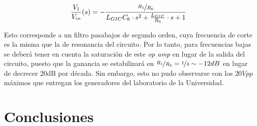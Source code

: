 \documentclass[../../tc_tp3_main.tex]{subfiles}
\begin{document}
\begin{equation}
	\frac{V_1}{V_{in}} (s)=  - \frac{\nicefrac{R_1}{R_6}}{ L_{GIC}C_6 \cdot s^2  + \frac{L_{GIC}}{R_6} \cdot s + 1}
\end{equation}

Esto corresponde a un filtro pasabajos de segundo orden, cuya frecuencia de corte es la misma que la de resonancia del circuito. Por lo tanto, para frecuencias bajas se deber\'a tener en cuenta la saturaci\'on de este \textit{op amp} en lugar de la salida del circuito, puesto que la ganancia se estabilizar\'a en $\nicefrac{R_1}{R_6} = \nicefrac{1}{4}\sim -12dB$ en lugar de decrecer 20dB por d\'ecada. Sin embargo, esto no pudo observarse con los $20V{pp}$ m\'aximos que entregan los generadores del laboratorio de la Universidad.

\section{Conclusiones}
\end{document}
